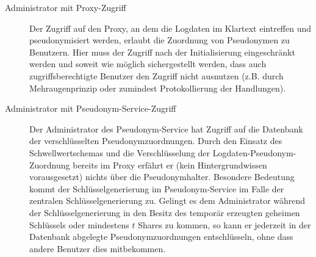 \begin{description}
  \item[Administrator mit Proxy-Zugriff] Der Zugriff auf den Proxy, an dem die Logdaten im Klartext eintreffen und pseudonymisiert werden, erlaubt die Zuordnung von Pseudonymen zu Benutzern. Hier muss der Zugriff nach der Initialisierung eingeschränkt werden und soweit wie möglich sichergestellt werden, dass auch zugriffsberechtigte Benutzer den Zugriff nicht ausnutzen (z.B. durch Mehraugenprinzip oder zumindest Protokollierung der Handlungen).
  
  \item[Administrator mit Pseudonym-Service-Zugriff] Der Administrator des Pseudonym-Service hat Zugriff auf die Datenbank der verschlüsselten Pseudonymzuordnungen. Durch den Einsatz des Schwellwertschemas und die Verschlüsselung der Logdaten-Pseudonym-Zuordnung bereits im Proxy erfährt er (kein Hintergrundwissen vorausgesetzt) nichts über die Pseudonymhalter. Besondere Bedeutung kommt der Schlüsselgenerierung im Pseudonym-Service im Falle der zentralen Schlüsselgenerierung zu. Gelingt es dem Administrator während der Schlüsselgenerierung in den Besitz des temporär erzeugten geheimen Schlüssels oder mindestens \(t\) Shares zu kommen, so kann er jederzeit in der Datenbank abgelegte Pseudonymzuordnungen entschlüsseln, ohne dass andere Benutzer dies mitbekommen.
\end{description}